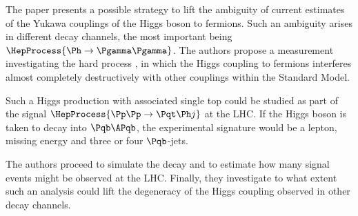 

\usetikzlibrary{calc}
\usetikzlibrary{arrows,shapes}

\newcommand{\package}[1]{\texttt{#1}}
\newcommand{\class}[1]{\texttt{#1}}
\newcommand{\function}[1]{\texttt{#1}}
\newcommand{\fpath}[1]{\texttt{#1}}

\captionsetup{width=0.45\textwidth}

\newcommand{\eg}{e.g.\@ }

\usepackage{hyphenat}




The paper presents a possible strategy to lift the ambiguity of current estimates of the Yukawa couplings of the Higgs boson to fermions.
Such an ambiguity arises in different decay channels, the most important being $\HepProcess{\Ph\to\Pgamma\Pgamma}$.
The authors propose a measurement investigating the hard process \HepProcess{\PW\Pqb\to\Pqt\Ph}, in which the Higgs coupling to fermions interferes almost completely destructively with other couplings within the Standard Model.

Such a Higgs production with associated single top could be studied as part of the signal $\HepProcess{\Pp\Pp\to\Pqt\Ph j}$ at the LHC.
If the Higgs boson is taken to decay into $\Pqb\APqb$, the experimental signature would be a lepton, missing energy and three or four $\Pqb$-jets.

The authors proceed to simulate the decay and to estimate how many signal events might be observed at the LHC.
Finally, they investigate to what extent such an analysis could lift the degeneracy of the Higgs coupling observed in other decay channels.


